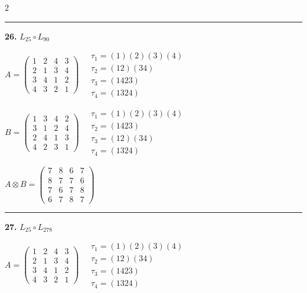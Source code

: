 \begin{multicols}{2}
\vspace{0.3em}
\hrule
\vspace{0.3em}

\noindent\textbf{26.} $L_{25} \circ L_{90}$

$A = \begin{pmatrix} 1 & 2 & 4 & 3 \\ 2 & 1 & 3 & 4 \\ 3 & 4 & 1 & 2 \\ 4 & 3 & 2 & 1 \end{pmatrix} \quad \begin{matrix} \tau_{1}=(1)(2)(3)(4) \\ \tau_{2}=(1 2)(3 4) \\ \tau_{3}=(1 4 2 3) \\ \tau_{4}=(1 3 2 4) \end{matrix}$

$B = \begin{pmatrix} 1 & 3 & 4 & 2 \\ 3 & 1 & 2 & 4 \\ 2 & 4 & 1 & 3 \\ 4 & 2 & 3 & 1 \end{pmatrix} \quad \begin{matrix} \tau_{1}=(1)(2)(3)(4) \\ \tau_{2}=(1 4 2 3) \\ \tau_{3}=(1 2)(3 4) \\ \tau_{4}=(1 3 2 4) \end{matrix}$

$A \otimes B = \begin{pmatrix} 7 & 8 & 6 & 7 \\ 8 & 7 & 7 & 6 \\ 7 & 6 & 7 & 8 \\ 6 & 7 & 8 & 7 \end{pmatrix}$

\vspace{0.3em}
\hrule
\vspace{0.3em}

\noindent\textbf{27.} $L_{25} \circ L_{278}$

$A = \begin{pmatrix} 1 & 2 & 4 & 3 \\ 2 & 1 & 3 & 4 \\ 3 & 4 & 1 & 2 \\ 4 & 3 & 2 & 1 \end{pmatrix} \quad \begin{matrix} \tau_{1}=(1)(2)(3)(4) \\ \tau_{2}=(1 2)(3 4) \\ \tau_{3}=(1 4 2 3) \\ \tau_{4}=(1 3 2 4) \end{matrix}$


\end{multicols}
